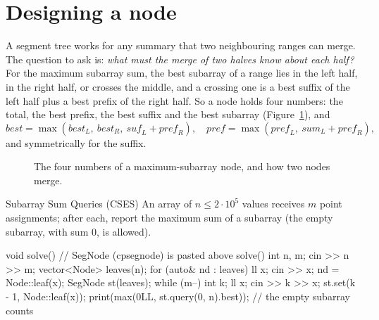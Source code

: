 \section[Designing a node]{Designing a node \hfill \plat}\label{sec:segnode}

A segment tree works for any summary that two neighbouring ranges can merge. The question to ask is: \emph{what must the merge of two
halves know about each half?} For the maximum subarray sum, the best subarray of a range lies in the left half, in the right half, or
crosses the middle, and a crossing one is a best suffix of the left half plus a best prefix of the right half. So a node holds four
numbers: the total, the best prefix, the best suffix and the best subarray (Figure~\ref{fig:segnode}), and
\[
  \mathit{best} = \max(\mathit{best}_L,\ \mathit{best}_R,\ \mathit{suf}_L + \mathit{pref}_R), \quad
  \mathit{pref} = \max(\mathit{pref}_L,\ \mathit{sum}_L + \mathit{pref}_R),
\]
and symmetrically for the suffix.

\begin{figure}[htbp]
\centering
{}
\caption{The four numbers of a maximum-subarray node, and how two nodes merge.}
\label{fig:segnode}
\end{figure}

\begin{problem}{Subarray Sum Queries (CSES)}
An array of $n \le 2 \cdot 10^5$ values receives $m$ point assignments; after each, report the maximum sum of a subarray (the empty
subarray, with sum 0, is allowed).
\end{problem}

\begin{code}
void solve() {  // SegNode (cpsegnode) is pasted above solve()
    int n, m;
    cin >> n >> m;
    vector<Node> leaves(n);
    for (auto& nd : leaves) {
        ll x;
        cin >> x;
        nd = Node::leaf(x);
    }
    SegNode st(leaves);
    while (m--) {
        int k;
        ll x;
        cin >> k >> x;
        st.set(k - 1, Node::leaf(x));
        print(max(0LL, st.query(0, n).best));  // the empty subarray counts
    }
}
\end{code}

